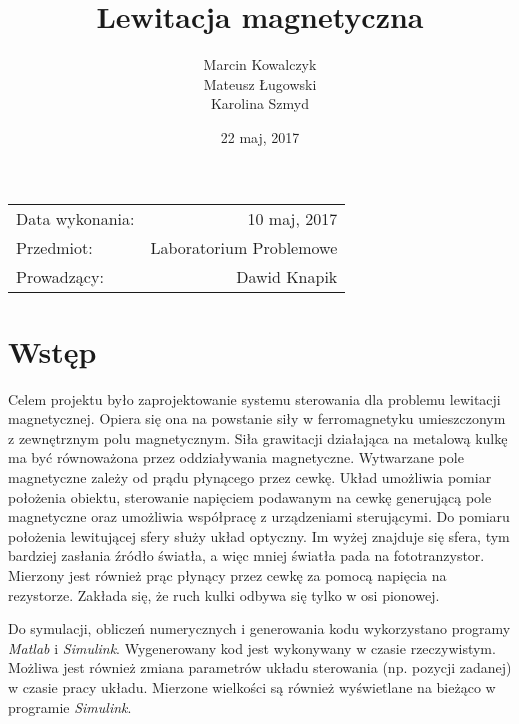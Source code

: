 \documentclass[11pt,a4paper]{article}
\title{\textbf{Lewitacja magnetyczna}} %
\author{Marcin Kowalczyk \\ Mateusz Ługowski \\ Karolina Szmyd} %
\date{22 maj, 2017} %
\begin{document}
\maketitle %

\begin{center}
\begin{tabular}{l r}
Data wykonania: & 10 maj, 2017 \\ %
Przedmiot: & Laboratorium Problemowe \\
Prowadzący: & Dawid Knapik %
\end{tabular}
\end{center}

\section{Wstęp}
\label{sec:wstep}
Celem projektu było zaprojektowanie systemu sterowania dla problemu lewitacji magnetycznej. Opiera się ona na powstanie siły w ferromagnetyku umieszczonym z zewnętrznym polu magnetycznym. Siła grawitacji działająca na metalową kulkę ma być równoważona przez oddziaływania magnetyczne. Wytwarzane pole magnetyczne zależy od prądu płynącego przez cewkę. Układ umożliwia pomiar położenia obiektu, sterowanie napięciem podawanym na cewkę generującą pole magnetyczne oraz umożliwia współpracę z urządzeniami sterującymi. Do pomiaru położenia lewitującej sfery służy układ optyczny. Im wyżej znajduje się sfera, tym bardziej zasłania źródło światła, a więc mniej światła pada na fototranzystor. Mierzony jest również prąc płynący przez cewkę za pomocą napięcia na rezystorze. Zakłada się, że ruch kulki odbywa się tylko w osi pionowej.

Do symulacji, obliczeń numerycznych i generowania kodu wykorzystano programy \textit{Matlab} i \textit{Simulink}. Wygenerowany kod jest wykonywany w czasie rzeczywistym. Możliwa jest również zmiana parametrów układu sterowania (np. pozycji zadanej) w czasie pracy układu. Mierzone wielkości są również wyświetlane na bieżąco w programie \textit{Simulink}.
\end{document}
